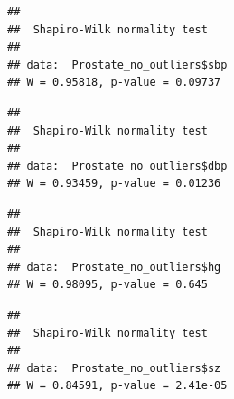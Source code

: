 \documentclass[
]{article}
\newenvironment{Shaded}{\begin{snugshade}}{\end{snugshade}}
\newcommand{\FunctionTok}[1]{\textcolor[rgb]{0.00,0.00,0.00}{#1}}
\newcommand{\NormalTok}[1]{#1}
\newcommand{\SpecialCharTok}[1]{\textcolor[rgb]{0.00,0.00,0.00}{#1}}
\begin{document}
\begin{Shaded}
\end{Shaded}

\begin{verbatim}
## 
##  Shapiro-Wilk normality test
## 
## data:  Prostate_no_outliers$sbp
## W = 0.95818, p-value = 0.09737
\end{verbatim}

\begin{Shaded}
\end{Shaded}

\begin{verbatim}
## 
##  Shapiro-Wilk normality test
## 
## data:  Prostate_no_outliers$dbp
## W = 0.93459, p-value = 0.01236
\end{verbatim}

\begin{Shaded}
\end{Shaded}

\begin{verbatim}
## 
##  Shapiro-Wilk normality test
## 
## data:  Prostate_no_outliers$hg
## W = 0.98095, p-value = 0.645
\end{verbatim}

\begin{Shaded}
\end{Shaded}

\begin{verbatim}
## 
##  Shapiro-Wilk normality test
## 
## data:  Prostate_no_outliers$sz
## W = 0.84591, p-value = 2.41e-05
\end{verbatim}
\end{document}
